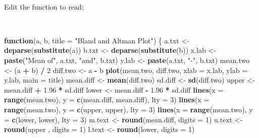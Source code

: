 \documentclass[12pt,a4paper]{book}
\newenvironment{Shaded}{\begin{snugshade}}{\end{snugshade}}
\newcommand{\KeywordTok}[1]{\textcolor[rgb]{0.13,0.29,0.53}{\textbf{#1}}}
\newcommand{\DataTypeTok}[1]{\textcolor[rgb]{0.13,0.29,0.53}{#1}}
\newcommand{\DecValTok}[1]{\textcolor[rgb]{0.00,0.00,0.81}{#1}}
\newcommand{\FloatTok}[1]{\textcolor[rgb]{0.00,0.00,0.81}{#1}}
\newcommand{\StringTok}[1]{\textcolor[rgb]{0.31,0.60,0.02}{#1}}
\newcommand{\ControlFlowTok}[1]{\textcolor[rgb]{0.13,0.29,0.53}{\textbf{#1}}}
\newcommand{\OperatorTok}[1]{\textcolor[rgb]{0.81,0.36,0.00}{\textbf{#1}}}
\newcommand{\NormalTok}[1]{#1}
\theoremstyle{definition}
\theoremstyle{definition}
\theoremstyle{definition}
\theoremstyle{remark}
\begin{document}
~

Edit the function to read:

~

\begin{Shaded}
\begin{Highlighting}[]
\ControlFlowTok{function}\NormalTok{(a, b, }\DataTypeTok{title =} \StringTok{"Bland and Altman Plot"}\NormalTok{) \{}
\NormalTok{  a.txt <-}\StringTok{ }\KeywordTok{deparse}\NormalTok{(}\KeywordTok{substitute}\NormalTok{(a))}
\NormalTok{  b.txt <-}\StringTok{ }\KeywordTok{deparse}\NormalTok{(}\KeywordTok{substitute}\NormalTok{(b))}
\NormalTok{  x.lab <-}\StringTok{ }\KeywordTok{paste}\NormalTok{(}\StringTok{"Mean of"}\NormalTok{, a.txt, }\StringTok{"and"}\NormalTok{, b.txt)}
\NormalTok{  y.lab <-}\StringTok{ }\KeywordTok{paste}\NormalTok{(a.txt, }\StringTok{"-"}\NormalTok{, b.txt)}
\NormalTok{  mean.two <-}\StringTok{ }\NormalTok{(a }\OperatorTok{+}\StringTok{ }\NormalTok{b) }\OperatorTok{/}\StringTok{ }\DecValTok{2}
\NormalTok{  diff.two <-}\StringTok{ }\NormalTok{a }\OperatorTok{-}\StringTok{ }\NormalTok{b}
  \KeywordTok{plot}\NormalTok{(mean.two, diff.two, }\DataTypeTok{xlab =}\NormalTok{ x.lab, }\DataTypeTok{ylab =}\NormalTok{ y.lab, }\DataTypeTok{main =}\NormalTok{ title) }
\NormalTok{  mean.diff <-}\StringTok{ }\KeywordTok{mean}\NormalTok{(diff.two)}
\NormalTok{  sd.diff <-}\StringTok{ }\KeywordTok{sd}\NormalTok{(diff.two)}
\NormalTok{  upper <-}\StringTok{ }\NormalTok{mean.diff }\OperatorTok{+}\StringTok{ }\FloatTok{1.96} \OperatorTok{*}\StringTok{ }\NormalTok{sd.diff}
\NormalTok{  lower <-}\StringTok{ }\NormalTok{mean.diff }\OperatorTok{-}\StringTok{ }\FloatTok{1.96} \OperatorTok{*}\StringTok{ }\NormalTok{sd.diff}
  \KeywordTok{lines}\NormalTok{(}\DataTypeTok{x =} \KeywordTok{range}\NormalTok{(mean.two), }\DataTypeTok{y =} \KeywordTok{c}\NormalTok{(mean.diff, mean.diff), }\DataTypeTok{lty =} \DecValTok{3}\NormalTok{) }
  \KeywordTok{lines}\NormalTok{(}\DataTypeTok{x =} \KeywordTok{range}\NormalTok{(mean.two), }\DataTypeTok{y =} \KeywordTok{c}\NormalTok{(upper, upper), }\DataTypeTok{lty =} \DecValTok{3}\NormalTok{)}
  \KeywordTok{lines}\NormalTok{(}\DataTypeTok{x =} \KeywordTok{range}\NormalTok{(mean.two), }\DataTypeTok{y =} \KeywordTok{c}\NormalTok{(lower, lower), }\DataTypeTok{lty =} \DecValTok{3}\NormalTok{)}
\NormalTok{  m.text <-}\StringTok{ }\KeywordTok{round}\NormalTok{(mean.diff, }\DataTypeTok{digits =} \DecValTok{1}\NormalTok{)}
\NormalTok{  u.text <-}\StringTok{ }\KeywordTok{round}\NormalTok{(upper , }\DataTypeTok{digits =} \DecValTok{1}\NormalTok{)}
\NormalTok{  l.text <-}\StringTok{ }\KeywordTok{round}\NormalTok{(lower, }\DataTypeTok{digits =} \DecValTok{1}\NormalTok{)}

\end{Highlighting}
\end{Shaded}
\end{document}
